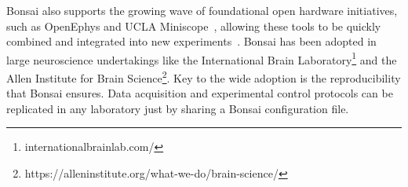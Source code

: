 Bonsai also supports the growing wave of foundational
open hardware initiatives, such as OpenEphys \citep{siegleEtAl17} and UCLA
Miniscope~\citep{caiEtAl16}, allowing these tools to be quickly combined and integrated into new experiments~\citep{buccinoEtAl18}.
%
Bonsai has been adopted in large neuroscience undertakings like the
International Brain
Laboratory\footnote{internationalbrainlab.com/}
and the Allen Institute for Brain
Science\footnote{https://alleninstitute.org/what-we-do/brain-science/}.
%
Key to the wide adoption is the reproducibility that Bonsai ensures.  Data acquisition and experimental control protocols can be 
replicated in any laboratory just by sharing a Bonsai configuration file. 
%


